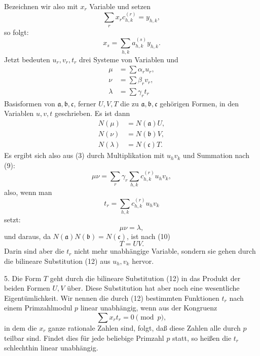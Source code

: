 \documentclass[11pt]{article}
\begin{document}
Bezeichnen wir also mit $x_r$ Variable und setzen
\begin{equation}
 \sum_r x_r c_{h,k}^{(r)}=y_{h,k},\tag{7}
\end{equation}
so folgt:
\begin{equation}
 x_s=\sum_{h,k}a_{h,k}^{(s)}y_{h,k}.\tag{8}
\end{equation}
Jetzt bedeuten $u_r,v_r,t_r$ drei Systeme von Variablen und
\begin{equation}
\begin{aligned}
 \mu&=\sum \alpha_r u_r,\\
 \nu&=\sum \beta_r v_r,\\
 \lambda&=\sum \gamma_r t_r
\end{aligned}\tag{9}
\end{equation}
Basisformen von $\mathfrak a,\mathfrak b,\mathfrak c$, ferner $U,V,T$ die zu $\mathfrak a,\mathfrak b,\mathfrak c$ gehörigen Formen, in den Variablen $u,v,t$ geschrieben. Es ist dann
\begin{equation}
\begin{aligned}
 N(\mu)&=N(\mathfrak a)U,\\
 N(\nu)&=N(\mathfrak b)V,\\
 N(\lambda)&=N(\mathfrak c)T.
\end{aligned}\tag{10}
\end{equation}
Es ergibt sich also aus (3) durch Multiplikation mit $u_hv_k$ und Summation nach (9):
\begin{equation}
 \mu\nu=\sum_r \gamma_r\sum_{h,k}c_{h,k}^{(r)}u_hv_k,\tag{11}
\end{equation}
also, wenn man
\begin{equation}
 t_r=\sum_{h,k}c_{h,k}^{(r)}u_hv_k\tag{12}
\end{equation}
setzt:
\begin{equation}
 \mu\nu=\lambda,\tag{13}
\end{equation}
und daraus, da $N(\mathfrak a)N(\mathfrak b)=N(\mathfrak c)$, ist nach (10)
\begin{equation}
 T=UV.\tag{14}
\end{equation}
Darin sind aber die $t_r$ nicht mehr unabhängige Variable, sondern sie gehen durch die bilineare Substitution (12) aus $u_h,v_k$ hervor.

5. Die Form $T$ geht durch die bilineare Substitution (12) in das Produkt der beiden Formen $U,V$ über. Diese Substitution hat aber noch eine wesentliche Eigentümlichkeit. Wir nennen die durch (12) bestimmten Funktionen $t_r$ nach einem Primzahlmodul $p$ linear unabhängig, wenn aus der Kongruenz
\begin{equation}
 \sum x_rt_r=0\pmod p,\tag{15}
\end{equation}
in dem die $x_r$ ganze rationale Zahlen sind, folgt, daß diese Zahlen alle durch $p$ teilbar sind. Findet dies für jede beliebige Primzahl $p$ statt, so heißen die $t_r$ schlechthin linear unabhängig.
\end{document}
